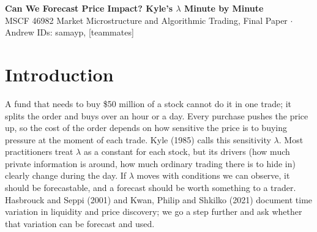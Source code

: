 \documentclass[10pt,letterpaper]{article}
\begin{document}
\begin{center}
{\Large\bfseries Can We Forecast Price Impact? Kyle's $\lambda$ Minute by Minute}\\[3pt]
{\small MSCF 46982 Market Microstructure and Algorithmic Trading, Final Paper \quad$\cdot$\quad Andrew IDs: samayp, [teammates]}
\end{center}
\vspace{-4pt}

\begin{abstract}
\noindent\small
When a trader buys, the price moves against them; Kyle's $\lambda$ measures by how much. We ask whether $\lambda$ can be forecast from market conditions one minute earlier, and whether that forecast helps someone executing a large order. Using one-minute NYSE TAQ data for the 30 Dow stocks in February 2020, processed in kdb+, we find that only the unexpected part of order flow moves prices; that impact in the first half hour is nearly twice its midday level; and that wide spreads raise impact while deep order books lower it. Forecasting impact this way improves out-of-sample fit, and most of a machine-learning model's extra accuracy comes from one simple fact: impact grows more slowly than order size. The forecast does not help a trader decide \emph{when} to trade within an hour, but it does help them estimate \emph{how much} an order will cost, cutting the error of that estimate by 10\%.
\end{abstract}

\section{Introduction}
A fund that needs to buy \$50 million of a stock cannot do it in one trade; it splits the order and buys over an hour or a day. Every purchase pushes the price up, so the cost of the order depends on how sensitive the price is to buying pressure at the moment of each trade. Kyle (1985) calls this sensitivity $\lambda$. Most practitioners treat $\lambda$ as a constant for each stock, but its drivers (how much private information is around, how much ordinary trading there is to hide in) clearly change during the day. If $\lambda$ moves with conditions we can observe, it should be forecastable, and a forecast should be worth something to a trader. Hasbrouck and Seppi (2001) and Kwan, Philip and Shkilko (2021) document time variation in liquidity and price discovery; we go a step further and ask whether that variation can be forecast and used.
\end{document}
